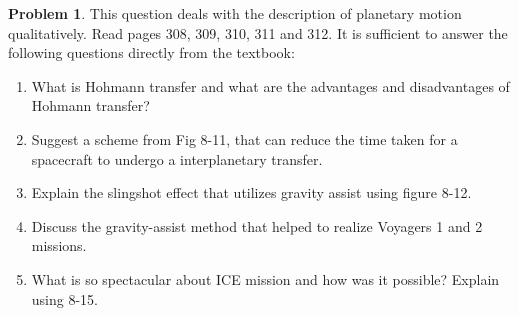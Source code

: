 \documentclass[10pt]{article}
\theoremstyle{definition}
\newtheorem{problem}{Problem}
\begin{document}
\begin{problem}
This question deals with the description of planetary motion qualitatively. Read pages 308,
309, 310, 311 and 312. It is sufficient to answer the following questions directly from the
textbook:
\begin{enumerate}[label=(\alph*)]
  \item What is Hohmann transfer and what are the advantages and disadvantages of Hohmann
        transfer?
  \item Suggest a scheme from Fig 8-11, that can reduce the time taken for a spacecraft to undergo a
        interplanetary transfer.
  \item Explain the slingshot effect that utilizes gravity assist using figure 8-12.
  \item Discuss the gravity-assist method that helped to realize Voyagers 1 and 2 missions.
  \item What is so spectacular about ICE mission and how was it possible? Explain using 8-15.
\end{enumerate}
\end{problem}
\end{document}
